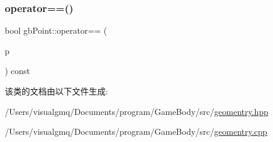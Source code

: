 \mbox{\label{classgb_point_ad7098c927e18d1d326fd9d68c0d4f7f9}} 
\subsubsection{\texorpdfstring{operator==()}{operator==()}}
{\footnotesize\ttfamily bool gb\+Point\+::operator== (\begin{DoxyParamCaption}\item[{\mbox{\hyperlink{classgb_point}{gb\+Point}}}]{p }\end{DoxyParamCaption}) const}



该类的文档由以下文件生成\+:\begin{DoxyCompactItemize}
\item 
/\+Users/visualgmq/\+Documents/program/\+Game\+Body/src/\mbox{\hyperlink{geomentry_8hpp}{geomentry.\+hpp}}\item 
/\+Users/visualgmq/\+Documents/program/\+Game\+Body/src/\mbox{\hyperlink{geomentry_8cpp}{geomentry.\+cpp}}\end{DoxyCompactItemize}
